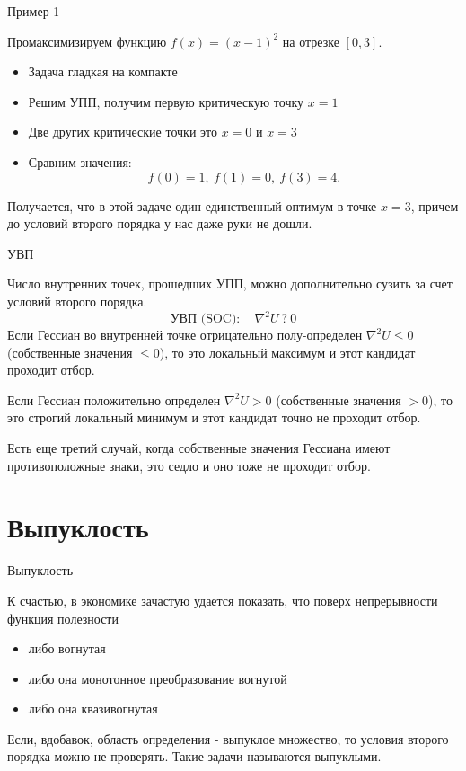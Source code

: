 \documentclass{beamer}
\begin{document}
\begin{frame}{Пример 1}

Промаксимизируем функцию $f(x) = (x-1)^2$ на отрезке $[0,3]$.

\begin{itemize}
  \item Задача гладкая на компакте
  \item Решим УПП, получим первую критическую точку $x = 1$
  \item Две других критические точки это $x = 0$ и $x = 3$
  \item Сравним значения: $$f(0) = 1, \ f(1) = 0, \ f(3) = 4.$$
\end{itemize}

Получается, что в этой задаче один единственный оптимум в точке $x = 3$, причем до условий второго порядка у нас даже руки не дошли.

\end{frame}

\begin{frame}{УВП}

Число внутренних точек, прошедших УПП, можно дополнительно сузить за счет условий второго порядка.
$$\text{УВП (SOC)}: \quad  \nabla^2 U \ ? \ 0$$
Если Гессиан во внутренней точке отрицательно полу-определен $\nabla^2 U \leqslant 0$ (собственные значения $\leqslant 0$), то это \alert{локальный максимум} и этот кандидат проходит отбор.

Если Гессиан положительно определен $\nabla^2 U > 0$ (собственные значения $>0$), то это строгий \alert{локальный минимум} и этот кандидат точно не проходит отбор.

Есть еще третий случай, когда собственные значения Гессиана имеют противоположные знаки, это \alert{седло} и оно тоже не проходит отбор.

\end{frame}

\section{Выпуклость}

\begin{frame}{Выпуклость}

К счастью, в экономике зачастую удается показать, что поверх непрерывности функция полезности

\begin{itemize}
\item либо вогнутая
\item либо она монотонное преобразование вогнутой
\item либо она квазивогнутая
\end{itemize}

Если, вдобавок, область определения - выпуклое множество, то условия второго порядка можно не проверять. Такие задачи называются \alert{выпуклыми}.

\end{frame}
\end{document}
